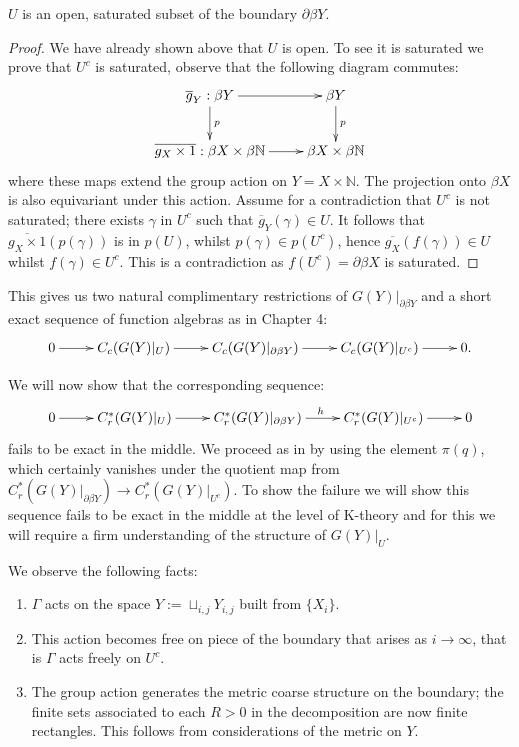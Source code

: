 \begin{example}
\begin{lemma}
$U$ is an open, saturated subset of the boundary $\partial\beta Y$. 
\end{lemma}
\begin{proof}
We have already shown above that $U$ is open. To see it is saturated we prove that $U^{c}$ is saturated, observe that the following diagram commutes:
\begin{equation*}
\xymatrix{
\overline{g}_{Y}:\beta Y\ar[r]\ar[d]^{p} & \beta Y\ar[d]^{p}\\
\overline{g_{X} \times 1}:  \beta X \times \beta \mathbb{N} \ar[r] & \beta X \times \beta \mathbb{N}
}
\end{equation*}
where these maps extend the group action on $Y=X \times \mathbb{N}$. The projection onto $\beta X$ is also equivariant under this action. Assume for a contradiction that $U^{c}$ is not saturated; there exists $\gamma$ in $U^{c}$ such that $\overline{g}_{Y}(\gamma) \in U$. It follows that $\overline{g_{X} \times 1}(p(\gamma))$ is in $p(U)$, whilst $p(\gamma) \in p(U^{c})$, hence $\overline{g_{X}}(f(\gamma))\in U$ whilst $f(\gamma) \in U^{c}$. This is a contradiction as $f(U^{c}) = \partial\beta X$ is saturated.
\end{proof}

This gives us two natural complimentary restrictions of $G(Y)|_{\partial\beta Y}$ and a short exact sequence of function algebras as in Chapter 4:
\begin{equation*}
\xymatrix{
0 \ar[r] & C_{c}(G(Y)|_{U}) \ar[r]& C_{c}(G(Y)|_{\partial\beta Y}) \ar[r] & C_{c}(G(Y)|_{U^{c}}) \ar[r] & 0.
}
\end{equation*}

We will now show that the corresponding sequence:
\begin{equation*}
\xymatrix{
0 \ar[r] & C^{*}_{r}(G(Y)|_{U}) \ar[r]& C_{r}^{*}(G(Y)|_{\partial\beta Y}) \ar[r]^{h} & C_{r}^{*}(G(Y)|_{U^{c}}) \ar[r] & 0
}
\end{equation*}
fails to be exact in the middle. We proceed as in \cite{explg1,MR1911663} by using the element $\pi(q)$, which certainly vanishes under the quotient map from $C^{*}_{r}(G(Y)|_{\partial\beta Y}) \rightarrow C^{*}_{r}(G(Y)|_{U^{c}})$. To show the failure we will show this sequence fails to be exact in the middle at the level of K-theory and for this we will require a firm understanding of the structure of $G(Y)|_{U}$.

We observe the following facts: 
\begin{enumerate}
\item $\Gamma$ acts on the space $Y:=\sqcup_{i,j}Y_{i,j}$ built from $\lbrace X_{i} \rbrace$.
\item This action becomes free on piece of the boundary that arises as $i \rightarrow \infty$, that is $\Gamma$ acts freely on $U^{c}$.
\item The group action generates the metric coarse structure on the boundary; the finite sets associated to each $R>0$ in the decomposition are now finite rectangles. This follows from considerations of the metric on $Y$.
\end{enumerate} 


\end{example}
